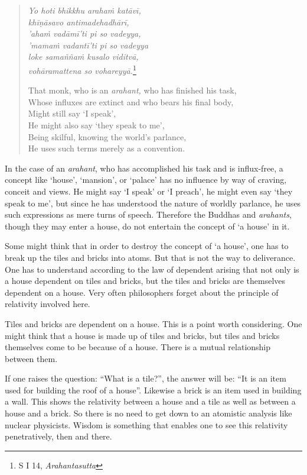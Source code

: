 \clearpage

\begin{quote}
\emph{Yo hoti bhikkhu arahaṁ katāvī,}\\
\emph{khīṇāsavo antimadehadhārī,}\\
\emph{'ahaṁ vadāmī'ti pi so vadeyya,}\\
\emph{'mamaṁ vadantī'ti pi so vadeyya}\\
\emph{loke samaññaṁ kusalo viditvā,}\\
\emph{vohāramattena so vohareyyā.}\footnote{S I 14, \emph{Arahantasutta}}

That monk, who is an \emph{arahant,} who has finished his task,\\
Whose influxes are extinct and who bears his final body,\\
Might still say `I speak',\\
He might also say `they speak to me',\\
Being skilful, knowing the world's parlance,\\
He uses such terms merely as a convention.
\end{quote}

In the case of an \emph{arahant}, who has accomplished his task and is influx-free, a concept like `house', `mansion', or `palace' has no influence by way of craving, conceit and views. He might say `I speak' or `I preach', he might even say `they speak to me', but since he has understood the nature of worldly parlance, he uses such expressions as mere turns of speech. Therefore the Buddhas and \emph{arahants}, though they may enter a house, do not entertain the concept of `a house' in it.

Some might think that in order to destroy the concept of `a house', one has to break up the tiles and bricks into atoms. But that is not the way to deliverance. One has to understand according to the law of dependent arising that not only is a house dependent on tiles and bricks, but the tiles and bricks are themselves dependent on a house. Very often philosophers forget about the principle of relativity involved here.

Tiles and bricks are dependent on a house. This is a point worth considering. One might think that a house is made up of tiles and bricks, but tiles and bricks themselves come to be because of a house. There is a mutual relationship between them.

If one raises the question: ``What is a tile?'', the answer will be: ``It is an item used for building the roof of a house''. Likewise a brick is an item used in building a wall. This shows the relativity between a house and a tile as well as between a house and a brick. So there is no need to get down to an atomistic analysis like nuclear physicists. Wisdom is something that enables one to see this relativity penetratively, then and there.

